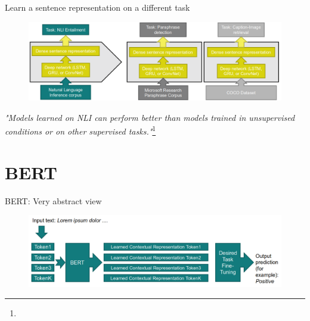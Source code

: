 \documentclass[12pt,aspectratio=169,handout]{beamer}
\begin{document}
\begin{frame}{Learn a sentence representation on a different task}
	
	\begin{figure}
		\includegraphics[width=0.9\linewidth]{img/transfer.png}
	\end{figure}
	
	\begin{small}
		\emph{"Models learned on NLI can perform better than models trained in unsupervised conditions or on other supervised tasks."}\footnote{}
	\end{small}
	
	
\end{frame}


\section{BERT}


\begin{frame}{BERT: Very abstract view}
	
	\begin{figure}
		\includegraphics[width=\linewidth]{img/bert1.png}
	\end{figure}	
	
\end{frame}
\end{document}
